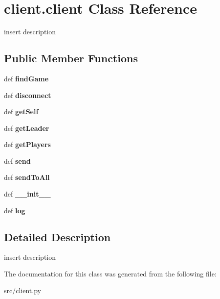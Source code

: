 \hypertarget{classclient_1_1client}{
\section{client.client Class Reference}
\label{classclient_1_1client}
}


insert description  


\subsection*{Public Member Functions}
\begin{DoxyCompactItemize}
\item 
\hypertarget{classclient_1_1client_a4c0ffad1d7dc0cd6ce3c5f2691b2a00e}{
def {\bfseries findGame}}
\label{classclient_1_1client_a4c0ffad1d7dc0cd6ce3c5f2691b2a00e}

\item 
\hypertarget{classclient_1_1client_a0c535ed06bcc803ce5470edf58b9c28f}{
def {\bfseries disconnect}}
\label{classclient_1_1client_a0c535ed06bcc803ce5470edf58b9c28f}

\item 
\hypertarget{classclient_1_1client_a86f12995e89279ad0f78ace8eb0fd7ba}{
def {\bfseries getSelf}}
\label{classclient_1_1client_a86f12995e89279ad0f78ace8eb0fd7ba}

\item 
\hypertarget{classclient_1_1client_abe9f7d96851252b82ed1081987b8b381}{
def {\bfseries getLeader}}
\label{classclient_1_1client_abe9f7d96851252b82ed1081987b8b381}

\item 
\hypertarget{classclient_1_1client_aa8050b1d64a11bc04035f9645de3df71}{
def {\bfseries getPlayers}}
\label{classclient_1_1client_aa8050b1d64a11bc04035f9645de3df71}

\item 
\hypertarget{classclient_1_1client_a49d71b2cc15f16f99d1bd07968cf0654}{
def {\bfseries send}}
\label{classclient_1_1client_a49d71b2cc15f16f99d1bd07968cf0654}

\item 
\hypertarget{classclient_1_1client_aaa24a503ef1da154cb9c986da1044e74}{
def {\bfseries sendToAll}}
\label{classclient_1_1client_aaa24a503ef1da154cb9c986da1044e74}

\item 
\hypertarget{classclient_1_1client_a5ca1239d2bd0f4c8b70aeddc9d6670d4}{
def {\bfseries \_\-\_\-init\_\-\_\-}}
\label{classclient_1_1client_a5ca1239d2bd0f4c8b70aeddc9d6670d4}

\item 
\hypertarget{classclient_1_1client_a8d01dfbd0a86eda9cd05d853e614d511}{
def {\bfseries log}}
\label{classclient_1_1client_a8d01dfbd0a86eda9cd05d853e614d511}

\end{DoxyCompactItemize}


\subsection{Detailed Description}
insert description 

The documentation for this class was generated from the following file:\begin{DoxyCompactItemize}
\item 
src/client.py\end{DoxyCompactItemize}
